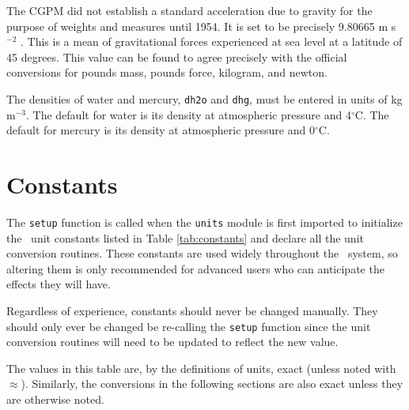 The CGPM did not establish a standard acceleration due to gravity for the purpose of weights and measures until 1954.  It is set to be precisely 9.80665 m s$^{-2}$ \cite{cgpm:10:4}.  This is a mean of gravitational forces experienced at sea level at a latitude of 45 degrees.  This value can be found to agree precisely with the official conversions for pounds mass, pounds force, kilogram, and newton. 

The densities of water and mercury, \verb|dh2o| and \verb|dhg|, must be entered in units of kg m$^{-3}$.  The default for water is its density at atmospheric pressure and 4$^\circ$C.  The default for mercury is its density at atmospheric pressure and 0$^\circ$C.

\section{Constants}\label{sec:units:constants}

The \verb|setup| function is called when the \verb|units| module is first imported to initialize the \PM\ unit constants listed in Table \ref{tab:constants} and declare all the unit conversion routines.  These constants are used widely throughout the \PM\ system, so altering them is only recommended for advanced users who can anticipate the effects they will have.  

Regardless of experience, constants should never be changed manually.  They should only ever be changed be re-calling the \verb|setup| function since the unit conversion routines will need to be updated to reflect the new value.

The values in this table are, by the definitions of units, exact (unless noted with $\approx$).  Similarly, the conversions in the following sections are also exact unless they are otherwise noted.

